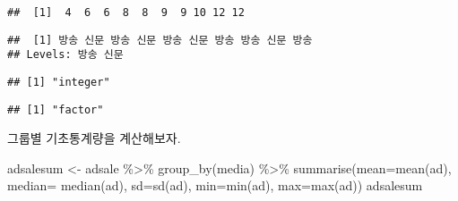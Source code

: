 \documentclass[
]{book}
\newenvironment{Shaded}{\begin{snugshade}}{\end{snugshade}}
\newcommand{\AttributeTok}[1]{\textcolor[rgb]{0.77,0.63,0.00}{#1}}
\newcommand{\FunctionTok}[1]{\textcolor[rgb]{0.00,0.00,0.00}{#1}}
\newcommand{\NormalTok}[1]{#1}
\newcommand{\OtherTok}[1]{\textcolor[rgb]{0.56,0.35,0.01}{#1}}
\newcommand{\SpecialCharTok}[1]{\textcolor[rgb]{0.00,0.00,0.00}{#1}}
\begin{document}
\begin{Shaded}
\end{Shaded}

\begin{verbatim}
##  [1]  4  6  6  8  8  9  9 10 12 12
\end{verbatim}

\begin{Shaded}
\end{Shaded}

\begin{verbatim}
##  [1] 방송 신문 방송 신문 방송 신문 방송 방송 신문 방송
## Levels: 방송 신문
\end{verbatim}

\begin{Shaded}
\end{Shaded}

\begin{verbatim}
## [1] "integer"
\end{verbatim}

\begin{Shaded}
\end{Shaded}

\begin{verbatim}
## [1] "factor"
\end{verbatim}

그룹별 기초통계량을 계산해보자.

\begin{Shaded}
\begin{Highlighting}[]
\NormalTok{adsalesum }\OtherTok{\textless{}{-}}\NormalTok{ adsale }\SpecialCharTok{\%\textgreater{}\%} \FunctionTok{group\_by}\NormalTok{(media)  }\SpecialCharTok{\%\textgreater{}\%}  \FunctionTok{summarise}\NormalTok{(}\AttributeTok{mean=}\FunctionTok{mean}\NormalTok{(ad), }\AttributeTok{median=} \FunctionTok{median}\NormalTok{(ad), }\AttributeTok{sd=}\FunctionTok{sd}\NormalTok{(ad), }\AttributeTok{min=}\FunctionTok{min}\NormalTok{(ad), }\AttributeTok{max=}\FunctionTok{max}\NormalTok{(ad))}
\NormalTok{adsalesum}
\end{Highlighting}
\end{Shaded}
\end{document}
